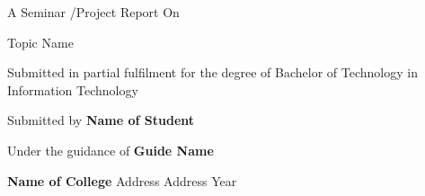 
\begin{center}
A Seminar /Project Report On

\LARGE{Topic Name}

\end{center}

\vspace{3cm}

\begin{center}

Submitted in partial fulfilment for the
\linebreak degree of Bachelor of Technology in
\linebreak  Information Technology
\end{center}
\vspace{2cm}
\begin{center}

Submitted by
\linebreak \textbf{Name of Student}
\vspace{2cm}

 Under the guidance of
\linebreak \textbf{Guide Name}
\end{center} 

\vspace{2cm}
\begin{center}

\vspace{1cm}
 


 \textbf{Name of College}
\linebreak Address 
\linebreak Address
\linebreak Year
\end{center}


%

